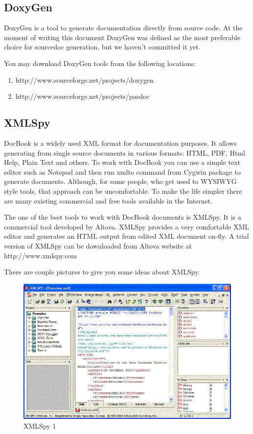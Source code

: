 \documentclass[a4paper,12pt,oneside]{book}
\begin{document}
\subsection{DoxyGen}

DoxyGen is a tool to generate documentation directly from source code.
At the moment of writing this document DoxyGen was defined as the most preferable choice for sourcedoc generation, but we haven’t committed it yet.

You may download DoxyGen tools from the following locations:
\begin{enumerate}
  \item http://www.sourceforge.net/projects/doxygen
	\item http://www.sourceforge.net/projects/pasdoc
\end{enumerate}

\subsection{XMLSpy}

DocBook is a widely used XML format for documentation purposes.
It allows generating from single source documents in various formats: HTML, PDF, Html Help, Plain Text and others.
To work with DocBook you can use a simple text editor such as Notepad and then run xmlto command from Cygwin package to generate documents.
Although, for some people, who get used to WYSIWYG style tools, that approach can be uncomfortable.
To make the life simpler there are many existing commercial and free tools available in the Internet. 

The one of the best tools to work with DocBook documents is XMLSpy.
It is a commercial tool developed by Altova.
XMLSpy provides a very comfortable XML editor and generates an HTML output from edited XML document on-fly.
A trial version of XMLSpy can be downloaded from Altova website at http://www.xmlspy.com

There are couple pictures to give you some ideas about XMLSpy.

\begin{figure}[htbp] 
  \centering
  \includegraphics[width=1.0\textwidth]{BTE/XmlSpy1.png}
  \caption{XMLSpy 1}
  \label{fig:XmlSpy1}
\end{figure}
\end{document}
